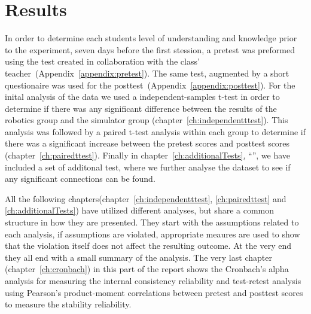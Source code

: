 \chapter{Results}
In order to determine each students level of understanding and knowledge prior to the experiment, seven days before the first stession, a pretest was preformed using the test created in collaboration with the class' teacher~(Appendix~\ref{appendix:pretest}). 
The same test, augmented by a short questionaire was used for the posttest~(Appendix~\ref{appendix:posttest}).
For the inital analysis of the data we used a independent-samples t-test in order to determine if there was any
significant difference between the results of the robotics group and the simulator group (chapter~\ref{ch:independentttest}).
This analysis was followed by a paired t-test analysis within each group 
to determine if there was a significant increase between the pretest scores and posttest scores (chapter~\ref{ch:pairedttest}).
Finally in chapter~\ref{ch:additionalTests}, "`"', we have included a set of additonal test,
where we further analyse the dataset to see if any significant connections can be found. 

\bigskip\noindent
All the following chapters(chapter~\ref{ch:independentttest}, \ref{ch:pairedttest} and \ref{ch:additionalTests}) have utilized different analyses, but share a common structure in how they are presented.
They start with the assumptions related to each analysis, if assumptions are violated, appropriate meaures are used to show that the violation itself does not affect the resulting outcome.
At the very end they all end with a small summary of the analysis. 
The very last chapter (chapter~\ref{ch:cronbach}) in this part of the report shows the Cronbach's alpha analysis for measuring the internal consistency reliability and test-retest analysis using Pearson's product-moment correlations between pretest and posttest scores to measure the stability reliability.

